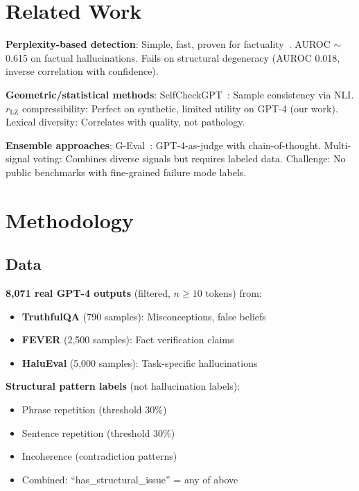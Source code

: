 \documentclass[11pt]{article}
\begin{document}
\section{Related Work}
\label{sec:related}

\textbf{Perplexity-based detection}:
Simple, fast, proven for factuality~\cite{lin2022truthfulqa}. AUROC $\sim$0.615 on factual hallucinations. Fails on structural degeneracy (AUROC 0.018, inverse correlation with confidence).

\textbf{Geometric/statistical methods}:
SelfCheckGPT~\cite{manakul2023selfcheck}: Sample consistency via NLI. $r_{\text{LZ}}$ compressibility: Perfect on synthetic, limited utility on GPT-4 (our work). Lexical diversity: Correlates with quality, not pathology.

\textbf{Ensemble approaches}:
G-Eval~\cite{liu2023geval}: GPT-4-as-judge with chain-of-thought. Multi-signal voting: Combines diverse signals but requires labeled data. Challenge: No public benchmarks with fine-grained failure mode labels.

\section{Methodology}
\label{sec:methodology}

\subsection{Data}

\textbf{8,071 real GPT-4 outputs} (filtered, $n \geq 10$ tokens) from:
\begin{itemize}
\item \textbf{TruthfulQA} (790 samples): Misconceptions, false beliefs
\item \textbf{FEVER} (2,500 samples): Fact verification claims
\item \textbf{HaluEval} (5,000 samples): Task-specific hallucinations
\end{itemize}

\textbf{Structural pattern labels} (not hallucination labels):
\begin{itemize}
\item Phrase repetition (threshold 30\%)
\item Sentence repetition (threshold 30\%)
\item Incoherence (contradiction patterns)
\item Combined: ``has\_structural\_issue'' = any of above
\end{itemize}
\end{document}
